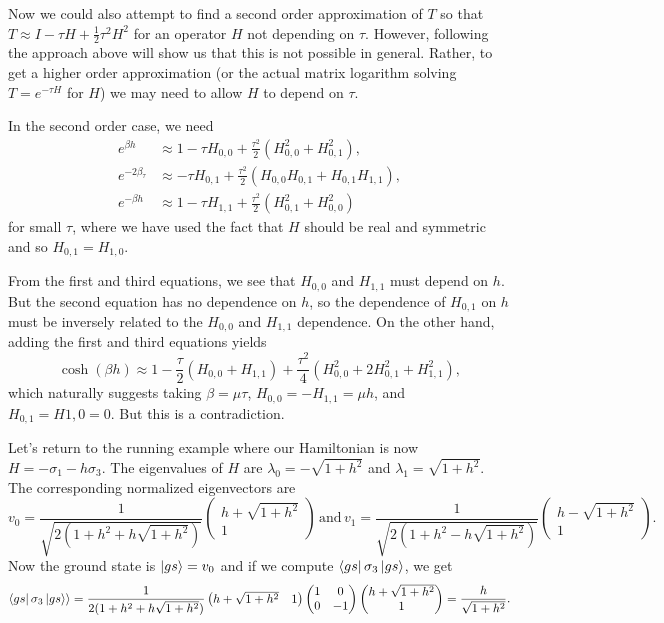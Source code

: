 \documentclass[10pt,reqno]{amsart}
\begin{document}
	Now we could also attempt to find a second order approximation of $T$ so that $T\approx I - \tau H + \frac{1}{2}\tau^2 H^2$ for an operator $H$ not depending on $\tau$. 
	However, following the approach above will show us that this is not possible in general.  
	Rather, to get a higher order approximation (or the actual matrix logarithm solving $T=e^{-\tau H}$ for $H$) we may need to allow $H$ to depend on $\tau$. 
	
	In the second order case, we need 
	\begin{align*}
		e^{\beta h} &\approx 1- \tau H_{0,0}+\frac{\tau^2}{2}(H_{0,0}^2+H_{0,1}^2),\\
		e^{-2\beta_\tau} &\approx -\tau H_{0,1}+\frac{\tau^2}{2}(H_{0,0}H_{0,1}+H_{0,1}H_{1,1}),\\
		e^{-\beta h} &\approx 1 - \tau H_{1,1}+\frac{\tau^2}{2}(H_{0,1}^2+H_{0,0}^2)
	\end{align*}
	for small $\tau$, where we have used the fact that $H$ should be real and symmetric and so $H_{0,1}=H_{1,0}$.
	
	From the first and third equations, we see that $H_{0,0}$ and $H_{1,1}$ must depend on $h$. 
	But the second equation has no dependence on $h$, so the dependence of $H_{0,1}$ on $h$ must be inversely related to the $H_{0,0}$ and $H_{1,1}$ dependence.
	On the other hand, adding the first and third equations yields
	\[\cosh(\beta h) \approx 1-\frac{\tau}{2}( H_{0,0}+ H_{1,1})+\frac{\tau^2}{4}(H_{0,0}^2+2H_{0,1}^2+H_{1,1}^2), \]
	which naturally suggests  taking $\beta=\mu\tau$, $H_{0,0}=-H_{1,1}=\mu h$, and $H_{0,1}=H{1,0}=0$. But this is a contradiction.
	
	Let's return to the running example where our Hamiltonian is now $H=-\sigma_1-h\sigma_3$.
	The eigenvalues of $H$ are $\lambda_0=-\sqrt{1+h^2}$ and $\lambda_1=\sqrt{1+h^2}$.
	The corresponding normalized eigenvectors are
		\[v_0= \frac{1}{\sqrt{2(1+h^2+h\sqrt{1+h^2})}}\begin{pmatrix}
		h+\sqrt{1+h^2} \\ 1
		\end{pmatrix} \, \text{and} \, v_1= \frac{1}{\sqrt{2(1+h^2-h\sqrt{1+h^2})}}\begin{pmatrix}
		h-\sqrt{1+h^2} \\ 1
		\end{pmatrix}. \]
	Now the ground state is $\ket{gs}=v_0$ and if we compute $\bra{gs} \sigma_3 \ket{gs}$, we get
		\[\bra{gs} \sigma_3 \ket{gs} \rangle=\frac{1}{2(1+h^2+h\sqrt{1+h^2})}\begin{pmatrix}
		h+\sqrt{1+h^2} & 1
		\end{pmatrix}
		\begin{pmatrix}
		1 & 0 \\
		0 & -1
		\end{pmatrix}
		\begin{pmatrix}
		h+\sqrt{1+h^2} \\ 1
		\end{pmatrix}=\frac{h}{\sqrt{1+h^2}} .\]
	
\end{document}
